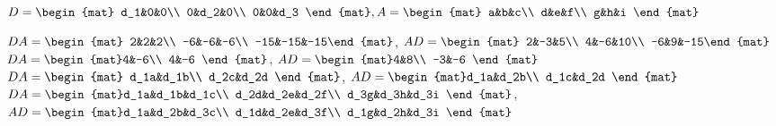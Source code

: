 \begin{Exercise}[
name={},
title={}, 
difficulty=0,
origin={\cite{GH}}]
\begin{multicols}{2}
\Question $D=\begin{mat} d_1&0&0\\  0&d_2&0\\  0&0&d_3 \end{mat}, \\ A=\begin{mat} a&b&c\\  d&e&f\\  g&h&i \end{mat}$
\EndCurrentQuestion
\end{multicols}

\end{Exercise}

\begin{Answer}
\Question $DA = \begin{mat} 2&2&2\\  -6&-6&-6\\  -15&-15&-15\end{mat}$, $AD = \begin{mat} 2&-3&5\\  4&-6&10\\  -6&9&-15\end{mat}$
\Question $DA = \begin{mat}4&-6\\  4&-6 \end{mat}$, $AD = \begin{mat}4&8\\  -3&-6 \end{mat}$
\Question $DA = \begin{mat} d_1a&d_1b\\  d_2c&d_2d \end{mat}$, $AD = \begin{mat}d_1a&d_2b\\  d_1c&d_2d \end{mat}$
\Question $DA = \begin{mat}d_1a&d_1b&d_1c\\  d_2d&d_2e&d_2f\\  d_3g&d_3h&d_3i \end{mat}$, $AD = \begin{mat}d_1a&d_2b&d_3c\\  d_1d&d_2e&d_3f\\  d_1g&d_2h&d_3i \end{mat}$
\end{Answer}
